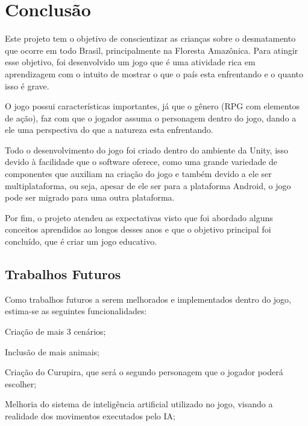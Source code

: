 \chapter{Conclusão}
\label{chap:conclusoes-e-trabalhos-futuros}

Este projeto tem o objetivo de conscientizar as crianças sobre o desmatamento que ocorre em todo Brasil, principalmente na Floresta Amazônica. Para atingir esse objetivo, foi desenvolvido um jogo que é uma atividade rica em aprendizagem com o intuito de mostrar o que o país esta enfrentando e o quanto isso é grave.

O jogo possui características importantes, já que o gênero (RPG com elementos de ação), faz com que o jogador assuma o personagem dentro do jogo, dando a ele uma perspectiva do que a natureza esta enfrentando.

Todo o desenvolvimento do jogo foi criado dentro do ambiente da Unity, isso devido à facilidade que o software oferece, como uma grande variedade de componentes que auxiliam na criação do jogo e também devido a ele ser multiplataforma, ou seja, apesar de ele ser para a plataforma Android, o jogo pode ser migrado para uma outra plataforma.

Por fim, o projeto atendeu as expectativas visto que foi abordado alguns conceitos aprendidos ao longos desses anos e que o objetivo principal foi concluído, que é criar um jogo educativo.


\section{Trabalhos Futuros}
\label{sec:trabalhos-futuros}

Como trabalhos futuros a serem melhorados e implementados dentro do jogo, estima-se as seguintes funcionalidades:

\begin{alineascomponto}
	
   \item Criação de mais 3 cenários;
   \item Inclusão de mais animais;
   \item Criação do Curupira, que será o segundo personagem que o jogador poderá escolher;
   \item Melhoria do sistema de inteligência artificial utilizado no jogo, visando a realidade dos movimentos executados pelo IA;

	\end{alineascomponto}
